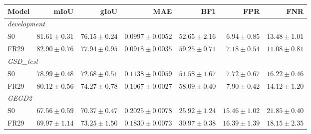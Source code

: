 \par\medskip\noindent\begin{minipage}{\linewidth}
\centering\footnotesize\setlength{\tabcolsep}{3pt}
\label{tab:fullseeds}
\begin{tabular}{lrrrrrr}
\toprule
Model & mIoU & gIoU & MAE & BF1 & FPR & FNR\\\midrule
\multicolumn{7}{l}{\textit{development}}\\
S0 & $81.61\pm0.31$ & $76.15\pm0.24$ & $0.0997\pm0.0052$ & $52.65\pm2.16$ & $6.94\pm0.85$ & $13.48\pm1.01$\\
FR29 & $82.90\pm0.76$ & $77.94\pm0.95$ & $0.0918\pm0.0035$ & $59.25\pm0.71$ & $7.18\pm0.54$ & $11.08\pm0.81$\\
\multicolumn{7}{l}{\textit{GSD\_test}}\\
S0 & $78.99\pm0.48$ & $72.68\pm0.51$ & $0.1138\pm0.0059$ & $51.58\pm1.67$ & $7.72\pm0.67$ & $16.22\pm0.46$\\
FR29 & $80.12\pm0.56$ & $74.27\pm0.78$ & $0.1067\pm0.0027$ & $58.09\pm0.40$ & $7.90\pm0.42$ & $14.12\pm1.20$\\
\multicolumn{7}{l}{\textit{GEGD2}}\\
S0 & $67.56\pm0.59$ & $70.37\pm0.47$ & $0.2025\pm0.0078$ & $25.92\pm1.24$ & $15.46\pm1.02$ & $21.85\pm0.40$\\
FR29 & $69.97\pm1.14$ & $73.25\pm1.50$ & $0.1830\pm0.0073$ & $30.97\pm0.38$ & $16.39\pm1.39$ & $18.15\pm2.35$\\
\bottomrule\end{tabular}
\end{minipage}\par\medskip
